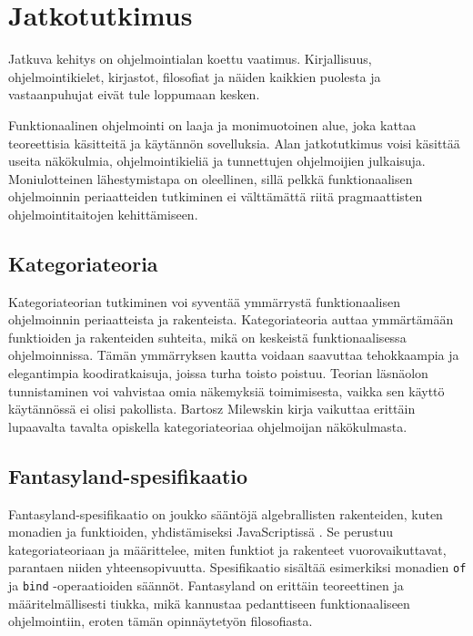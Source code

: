 \section{Jatkotutkimus}

Jatkuva kehitys on ohjelmointialan koettu vaatimus. Kirjallisuus, ohjelmointikielet, kirjastot, filosofiat ja näiden kaikkien puolesta ja vastaanpuhujat eivät tule loppumaan kesken.

Funktionaalinen ohjelmointi on laaja ja monimuotoinen alue, joka kattaa teoreettisia käsitteitä ja käytännön sovelluksia. Alan jatkotutkimus voisi käsittää useita näkökulmia, ohjelmointikieliä ja tunnettujen ohjelmoijien julkaisuja. Moniulotteinen lähestymistapa on oleellinen, sillä pelkkä funktionaalisen ohjelmoinnin periaatteiden tutkiminen ei välttämättä riitä pragmaattisten ohjelmointitaitojen kehittämiseen.

\subsection{Kategoriateoria}

Kategoriateorian tutkiminen voi syventää ymmärrystä funktionaalisen ohjelmoinnin periaatteista ja rakenteista. Kategoriateoria auttaa ymmärtämään funktioiden ja rakenteiden suhteita, mikä on keskeistä funktionaalisessa ohjelmoinnissa. Tämän ymmärryksen kautta voidaan saavuttaa tehokkaampia ja elegantimpia koodiratkaisuja, joissa turha toisto poistuu. Teorian läsnäolon tunnistaminen voi vahvistaa omia näkemyksiä toimimisesta, vaikka sen käyttö käytännössä ei olisi pakollista.
Bartosz Milewskin kirja  vaikuttaa erittäin lupaavalta tavalta opiskella kategoriateoriaa ohjelmoijan näkökulmasta.

\subsection{Fantasyland-spesifikaatio}

Fantasyland-spesifikaatio on joukko sääntöjä algebrallisten rakenteiden, kuten monadien ja funktioiden, yhdistämiseksi JavaScriptissä \cite{fantasy-land:contributors}. Se perustuu kategoriateoriaan ja määrittelee, miten funktiot ja rakenteet vuorovaikuttavat, parantaen niiden yhteensopivuutta. Spesifikaatio sisältää esimerkiksi monadien \texttt{of} ja \texttt{bind} -operaatioiden säännöt. Fantasyland on erittäin teoreettinen ja määritelmällisesti tiukka, mikä kannustaa pedanttiseen funktionaaliseen ohjelmointiin, eroten tämän opinnäytetyön filosofiasta.

